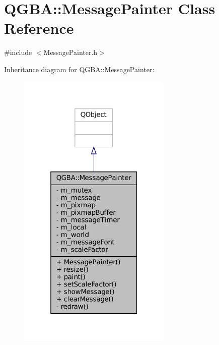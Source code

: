 \hypertarget{class_q_g_b_a_1_1_message_painter}{}\section{Q\+G\+BA\+:\+:Message\+Painter Class Reference}
\label{class_q_g_b_a_1_1_message_painter}


{\ttfamily \#include $<$Message\+Painter.\+h$>$}



Inheritance diagram for Q\+G\+BA\+:\+:Message\+Painter\+:
\nopagebreak
\begin{figure}[H]
\begin{center}
\leavevmode
\includegraphics[width=208pt]{class_q_g_b_a_1_1_message_painter__inherit__graph}
\end{center}
\end{figure}


